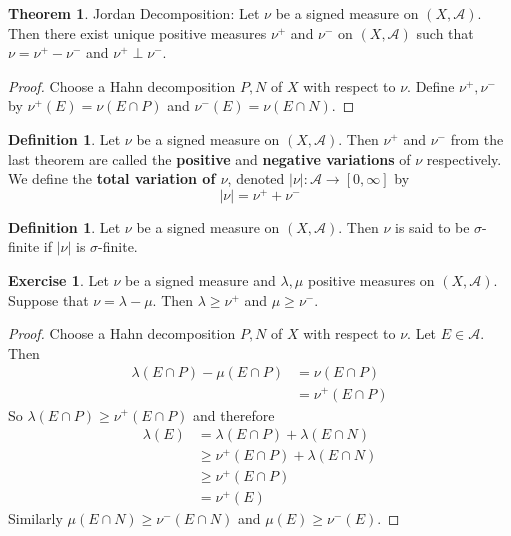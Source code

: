 \documentclass[12pt]{amsart}
\theoremstyle{definition}
\newtheorem{defn}[definition]{Definition}
\newtheorem{thm}[definition]{Theorem}
\newtheorem{ex}[definition]{Exercise}
\newcommand{\lam}{\lambda}
\newcommand{\sig}{\sigma}
\newcommand{\MA}{\mathcal{A}}
\newcommand{\lex}[1]{\label{ex:#1}}
\newcommand{\ld}[1]{\label{defn:#1}}
\begin{document}
	\begin{thm}{Jordan Decomposition:}
		Let $\nu$ be a signed measure on $(X, \MA)$. Then there exist unique positive measures $\nu^+$ and $\nu^-$ on $(X, \MA)$ such that $\nu = \nu^+ - \nu^-$ and $\nu^+ \perp \nu^-$. 
	\end{thm}
	
	\begin{proof}
		Choose a Hahn decomposition $P,N$ of $X$ with respect to $\nu$. Define $\nu^+, \nu^-$ by $\nu^+(E)= \nu(E \cap P)$ and $\nu^-(E) = \nu(E \cap N)$.
	\end{proof}
	
	\begin{defn} \ld{41008} 
		Let $\nu$ be a signed measure on $(X, \MA)$. Then $\nu^+$ and $\nu^-$ from the last theorem are called the \textbf{positive} and \textbf{negative variations} of $\nu$ respectively. We define the \textbf{total variation of $\nu$}, denoted $|\nu|:\MA \rightarrow [0, \infty]$ by $$|\nu| = \nu^+ + \nu^-$$ 
	\end{defn}
	
	\begin{defn} \ld{41009} 
		Let $\nu$ be a signed measure on $(X,\MA)$. Then $\nu$ is said to be $\sig$-finite if $|\nu|$ is $\sig$-finite.
	\end{defn}
	
	\begin{ex} \lex{41010} 
		Let $\nu$ be a signed measure and $\lam, \mu$ positive measures on $(X,\MA)$. Suppose that $\nu = \lam - \mu$. Then $\lam \geq \nu^+$ and $\mu \geq \nu^-$.
	\end{ex}
	
	\begin{proof}
		Choose a Hahn decomposition $P,N$ of $X$ with respect to $\nu$. Let $E \in \MA$. Then 
		\begin{align*}
			\lam(E \cap P) - \mu(E \cap P) 
			&= \nu(E \cap P)\\
			&= \nu^+(E \cap P)
		\end{align*}
		So $\lam(E \cap P) \geq  \nu^+(E \cap P) $ and therefore 
		\begin{align*}
			\lam(E) 
			&= \lam(E \cap P) + \lam(E \cap N)\\
			& \geq \nu^+(E \cap P) + \lam (E \cap N)\\
			& \geq \nu^+(E \cap P)\\
			& = \nu^+(E)
		\end{align*} 
		Similarly $\mu(E \cap N) \geq \nu^-(E \cap N)$ and $\mu(E) \geq \nu^-(E)$.
	\end{proof}
	
\end{document}
